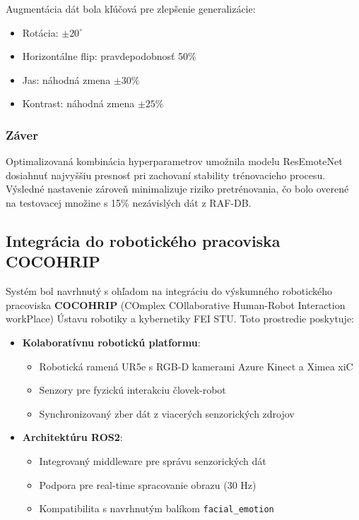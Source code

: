 Augmentácia dát bola kľúčová pre zlepšenie generalizácie:
\begin{itemize}
    \item Rotácia: $\pm 20^\circ$
    \item Horizontálne flip: pravdepodobnosť 50\%
    \item Jas: náhodná zmena $\pm 30\%$
    \item Kontrast: náhodná zmena $\pm 25\%$
\end{itemize}

\subsubsection{Záver}

Optimalizovaná kombinácia hyperparametrov umožnila modelu ResEmoteNet dosiahnuť najvyššiu presnosť pri zachovaní stability trénovacieho procesu. Výsledné nastavenie zároveň minimalizuje riziko pretrénovania, čo bolo overené na testovacej množine s 15\% nezávislých dát z RAF-DB.

\subsection{Integrácia do robotického pracoviska COCOHRIP}
Systém bol navrhnutý s ohľadom na integráciu do výskumného robotického pracoviska \textbf{COCOHRIP} (COmplex COllaborative Human-Robot Interaction workPlace) Ústavu robotiky a kybernetiky FEI STU. Toto prostredie poskytuje:

\begin{itemize}
\item \textbf{Kolaboratívnu robotickú platformu}: 
\begin{itemize}
\item Robotická ramená UR5e s RGB-D kamerami Azure Kinect a Ximea xiC
\item Senzory pre fyzickú interakciu človek-robot 
\item Synchronizovaný zber dát z viacerých senzorických zdrojov
\end{itemize}

\item \textbf{Architektúru ROS2}: 
\begin{itemize}
\item Integrovaný middleware pre správu senzorických dát
\item Podpora pre real-time spracovanie obrazu (30 Hz)
\item Kompatibilita s navrhnutým balíkom \texttt{facial\_emotion}
\end{itemize}
\end{itemize}

